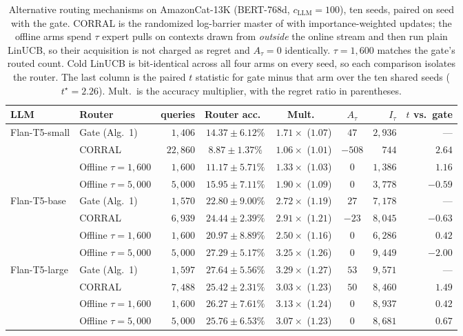 \documentclass{article}
\theoremstyle{definition}
\theoremstyle{remark}
\theoremstyle{remark}
\begin{document}
\begin{table}[h]
\centering
\caption{Alternative routing mechanisms on AmazonCat-13K (BERT-768d,
$c_{\mathrm{LLM}}=100$), ten seeds, paired on seed with the gate. CORRAL is the randomized
log-barrier master of \cite{agarwal2017corralling} with importance-weighted
updates; the offline arms spend $\tau$ expert pulls on contexts drawn from
\emph{outside} the online stream and then run plain LinUCB, so their
acquisition is not charged as regret and $A_\tau=0$ identically.
$\tau=1{,}600$ matches the gate's routed count. Cold LinUCB is bit-identical
across all four arms on every seed, so each comparison isolates the router.
The last column is the paired $t$ statistic for gate minus that arm over the
ten shared seeds ($t^\star=2.26$). Mult.\ is the accuracy multiplier, with
the regret ratio in parentheses.}
\label{tab:baselines}
\small
\setlength{\tabcolsep}{4pt}
\begin{tabular}{@{}llrcccrr@{}}
\toprule
LLM & Router & queries & Router acc.\ & Mult.\ & $A_\tau$ & $I_\tau$ & $t$ vs.\ gate \\
\midrule
\multirow{4}{*}{Flan-T5-small}
 & Gate (Alg.\ 1)    & $1{,}406$  & $14.37\pm6.12\%$ & $1.71\times$ ($1.07$) & $47$   & $2{,}936$ & --- \\
 & CORRAL            & $22{,}860$ & $8.87\pm1.37\%$  & $1.06\times$ ($1.01$) & $-508$ & $744$     & $\mathbf{2.64}$ \\
 & Offline $\tau{=}1{,}600$ & $1{,}600$ & $11.17\pm5.71\%$ & $1.33\times$ ($1.03$) & $0$ & $1{,}386$ & $1.16$ \\
 & Offline $\tau{=}5{,}000$ & $5{,}000$ & $15.95\pm7.11\%$ & $1.90\times$ ($1.09$) & $0$ & $3{,}778$ & $-0.59$ \\
\midrule
\multirow{4}{*}{Flan-T5-base}
 & Gate (Alg.\ 1)    & $1{,}570$ & $22.80\pm9.00\%$ & $2.72\times$ ($1.19$) & $27$  & $7{,}178$ & --- \\
 & CORRAL            & $6{,}939$ & $24.44\pm2.39\%$ & $2.91\times$ ($1.21$) & $-23$ & $8{,}045$ & $-0.63$ \\
 & Offline $\tau{=}1{,}600$ & $1{,}600$ & $20.97\pm8.89\%$ & $2.50\times$ ($1.16$) & $0$ & $6{,}286$ & $0.42$ \\
 & Offline $\tau{=}5{,}000$ & $5{,}000$ & $27.29\pm5.17\%$ & $3.25\times$ ($1.26$) & $0$ & $9{,}449$ & $-2.00$ \\
\midrule
\multirow{4}{*}{Flan-T5-large}
 & Gate (Alg.\ 1)    & $1{,}597$ & $27.64\pm5.56\%$ & $3.29\times$ ($1.27$) & $53$ & $9{,}571$ & --- \\
 & CORRAL            & $7{,}488$ & $25.42\pm2.31\%$ & $3.03\times$ ($1.23$) & $50$ & $8{,}460$ & $1.49$ \\
 & Offline $\tau{=}1{,}600$ & $1{,}600$ & $26.27\pm7.61\%$ & $3.13\times$ ($1.24$) & $0$ & $8{,}937$ & $0.42$ \\
 & Offline $\tau{=}5{,}000$ & $5{,}000$ & $25.76\pm6.53\%$ & $3.07\times$ ($1.23$) & $0$ & $8{,}681$ & $0.67$ \\
\bottomrule
\end{tabular}
\end{table}
\end{document}
